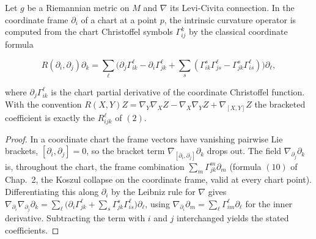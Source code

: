 \begin{lemma}
  \label{lem:dc-ch8-3-chart-curvature}
  \leanok
  Let $g$ be a Riemannian metric on $M$ and $\nabla$ its Levi-Civita connection.
  In the coordinate frame $\partial_i$ of a chart at a point $p$, the intrinsic
  curvature operator is computed from the chart Christoffel symbols
  $\Gamma^k_{ij}$ by the classical coordinate formula

  $$
  R(\partial_i,\partial_j)\partial_k
    = \sum_\ell\Big(\partial_j\Gamma^\ell_{ik}-\partial_i\Gamma^\ell_{jk}
      +\sum_s(\Gamma^s_{ik}\Gamma^\ell_{js}-\Gamma^s_{jk}\Gamma^\ell_{is})\Big)\partial_\ell,
  $$

  where $\partial_j\Gamma^\ell_{ik}$ is the chart partial derivative of the
  coordinate Christoffel function. With the convention
  $R(X,Y)Z=\nabla_Y\nabla_X Z-\nabla_X\nabla_Y Z+\nabla_{[X,Y]}Z$ the bracketed
  coefficient is exactly the $R^\ell_{ijk}$ of $(2)$.
\end{lemma}
\begin{proof}
  \leanok
\sketch
  In a coordinate chart the frame vectors have vanishing pairwise Lie brackets,
  $[\partial_i,\partial_j]=0$, so the bracket term
  $\nabla_{[\partial_i,\partial_j]}\partial_k$ drops out. The field
  $\nabla_{\partial_j}\partial_k$ is, throughout the chart, the frame combination
  $\sum_m\Gamma^m_{jk}\partial_m$ (formula $(10)$ of Chap.~2, the Koszul collapse
  on the coordinate frame, valid at every chart point). Differentiating this
  along $\partial_i$ by the Leibniz rule for $\nabla$ gives
  $\nabla_{\partial_i}\nabla_{\partial_j}\partial_k
   =\sum_\ell\big(\partial_i\Gamma^\ell_{jk}
   +\sum_s\Gamma^s_{jk}\Gamma^\ell_{is}\big)\partial_\ell$, using
  $\nabla_{\partial_i}\partial_m=\sum_\ell\Gamma^\ell_{im}\partial_\ell$ for the
  inner derivative. Subtracting the term with $i$ and $j$ interchanged yields the
  stated coefficients.
\end{proof}

